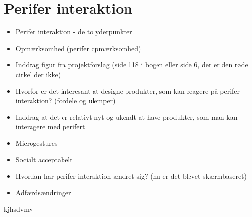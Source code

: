 \chapter{Perifer interaktion}
\label{PeriferInteratkion}
%
\begin{itemize}
  \item Perifer interaktion - de to yderpunkter
  \item Opmærksomhed (perifer opmærksomhed)
  \item Inddrag figur fra projektforslag (side 118 i bogen eller side 6, der er den røde cirkel der ikke)
  \item Hvorfor er det interesant at designe produkter, som kan reagere på perifer interaktion? (fordele og ulemper) 
  \item Inddrag at det er relativt nyt og ukendt at have produkter, som man kan interagere med perifert 
  \item Microgestures 
  \item Socialt acceptabelt 
  \item Hvordan har perifer interaktion ændret sig? (nu er det blevet skærmbaseret)
  \item Adfærdsændringer  
\end{itemize}


kjhsdvmv \parencite{PDF:PeripheralInteraction}